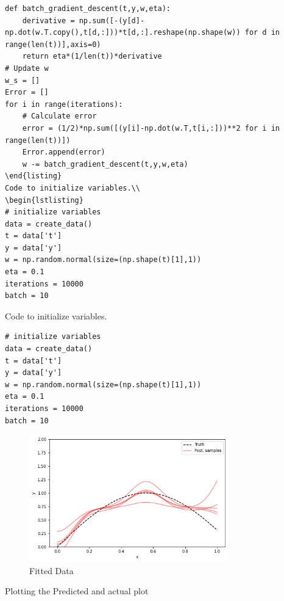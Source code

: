 \documentclass[journal,12pt,twocolumn]{IEEEtran}
\begin{document}
%
\begin{lstlisting}
def batch_gradient_descent(t,y,w,eta):
    derivative = np.sum([-(y[d]-np.dot(w.T.copy(),t[d,:]))*t[d,:].reshape(np.shape(w)) for d in range(len(t))],axis=0)
    return eta*(1/len(t))*derivative
# Update w
w_s = []
Error = []
for i in range(iterations):
    # Calculate error
    error = (1/2)*np.sum([(y[i]-np.dot(w.T,t[i,:]))**2 for i in range(len(t))])
    Error.append(error)
    w -= batch_gradient_descent(t,y,w,eta)
\end{listing}    
Code to initialize variables.\\
\begin{lstlisting}
# initialize variables
data = create_data()
t = data['t']
y = data['y']
w = np.random.normal(size=(np.shape(t)[1],1))
eta = 0.1
iterations = 10000
batch = 10
\end{lstlisting}
Code to initialize variables.\\
\begin{lstlisting}
# initialize variables
data = create_data()
t = data['t']
y = data['y']
w = np.random.normal(size=(np.shape(t)[1],1))
eta = 0.1
iterations = 10000
batch = 10
\end{lstlisting}
\begin{figure}[!h]
\begin{center}
\includegraphics[width=3.4in]{a2.png}
\end{center}
\caption{Fitted Data}
\label{fig:2}
\end{figure}
Plotting the Predicted and actual plot 
\end{document}
